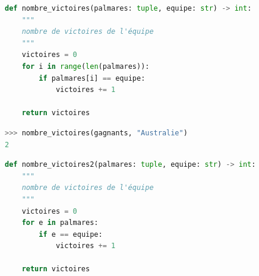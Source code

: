 \documentclass[svgnames,11pt]{beamer}
\begin{document}
\begin{frame}[fragile]
\begin{center}
\begin{lstlisting}[language=Python , basicstyle=\ttfamily\small, xleftmargin=0em, xrightmargin=0em]
def nombre_victoires(palmares: tuple, equipe: str) -> int:
    """
    nombre de victoires de l'équipe
    """
    victoires = 0
    for i in range(len(palmares)):
        if palmares[i] == equipe:
            victoires += 1

    return victoires
\end{lstlisting}
\label{CODE}
\end{center}   
\begin{center}
\begin{lstlisting}[language=Python , basicstyle=\ttfamily\small, xleftmargin=2em, xrightmargin=2em]
>>> nombre_victoires(gagnants, "Australie")
2
\end{lstlisting}
\label{CODE}
\end{center}
\end{frame}
\begin{frame}[fragile]
\begin{center}
\begin{lstlisting}[language=Python , basicstyle=\ttfamily\small, xleftmargin=0em, xrightmargin=0em]
def nombre_victoires2(palmares: tuple, equipe: str) -> int:
    """
    nombre de victoires de l'équipe
    """
    victoires = 0
    for e in palmares:
        if e == equipe:
            victoires += 1

    return victoires
\end{lstlisting}
\label{CODE}
\end{center}  
\end{frame}
\end{document}
